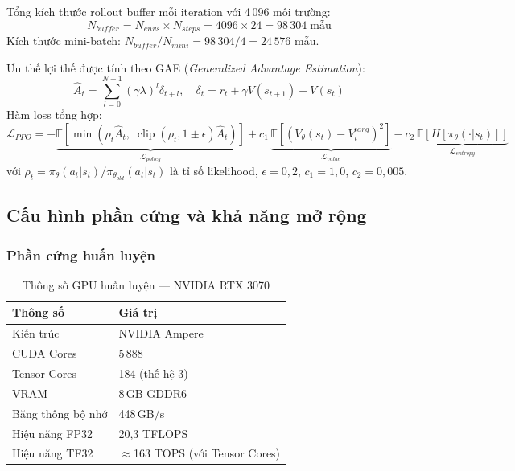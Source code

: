 Tổng kích thước rollout buffer mỗi iteration với 4\,096 môi trường:
\begin{equation}
    N_{buffer} = N_{envs} \times N_{steps} = 4096 \times 24 = 98\,304\;\text{mẫu}
    \label{eq:buffer_size}
\end{equation}
Kích thước mini-batch: $N_{buffer} / N_{mini} = 98\,304 / 4 = 24\,576$ mẫu.

Ưu thế lợi thế được tính theo GAE (\textit{Generalized Advantage Estimation}):
\begin{equation}
    \hat{A}_t = \sum_{l=0}^{N-1} (\gamma\lambda)^l \delta_{t+l},
    \quad \delta_t = r_t + \gamma V(s_{t+1}) - V(s_t)
    \label{eq:gae}
\end{equation}
Hàm loss tổng hợp:
\begin{equation}
    \mathcal{L}_{PPO} =
    -\underbrace{\mathbb{E}\!\left[\min\!\left(
        \rho_t \hat{A}_t,\;
        \operatorname{clip}(\rho_t, 1{\pm}\epsilon)\hat{A}_t
    \right)\right]}_{\mathcal{L}_{policy}}
    + c_1\,\underbrace{\mathbb{E}\!\left[(V_\theta(s_t) - V_t^{targ})^2\right]}_{\mathcal{L}_{value}}
    - c_2\,\underbrace{\mathbb{E}\!\left[H[\pi_\theta(\cdot|s_t)]\right]}_{\mathcal{L}_{entropy}}
    \label{eq:ppo_loss}
\end{equation}
với $\rho_t = \pi_\theta(a_t|s_t)/\pi_{\theta_{old}}(a_t|s_t)$ là tỉ số
likelihood, $\epsilon = 0{,}2$, $c_1 = 1{,}0$, $c_2 = 0{,}005$.

\subsection{Cấu hình phần cứng và khả năng mở rộng}

\subsubsection{Phần cứng huấn luyện}

\begin{table}[H]
    \centering
    \caption{Thông số GPU huấn luyện --- NVIDIA RTX 3070}
    \label{tab:gpu_spec}
    \renewcommand{\arraystretch}{1.3}
    \begin{tabular}{|l|l|}
    \hline
    \textbf{Thông số} & \textbf{Giá trị} \\
    \hline
    Kiến trúc         & NVIDIA Ampere \\
    CUDA Cores        & 5\,888 \\
    Tensor Cores      & 184 (thế hệ 3) \\
    VRAM              & 8\,GB GDDR6 \\
    Băng thông bộ nhớ & 448\,GB/s \\
    Hiệu năng FP32    & 20{,}3 TFLOPS \\
    Hiệu năng TF32    & $\approx$163 TOPS (với Tensor Cores) \\
    \hline
    \end{tabular}
\end{table}

